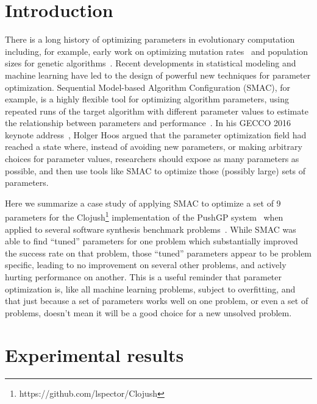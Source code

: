\section{Introduction}
\label{sec:introduction}

There is a long history of optimizing parameters in evolutionary 
computation~\cite{lobo2007parameter}
including, for example, early work on optimizing mutation 
rates~\cite{back1993optimal} and population sizes for genetic algorithms~\cite{alander1992optimal}.
Recent developments in statistical modeling and machine learning have
led to the design of powerful new techniques for parameter optimization. 
Sequential Model-based Algorithm Configuration (SMAC), for example, is a
highly flexible tool for optimizing algorithm parameters, using repeated runs
of the target algorithm with different parameter values to estimate
the relationship between parameters and performance~\cite{HutHooLey11-SMAC}. In his GECCO 2016 keynote 
address~\cite{Hoos:2016:TCM:2908812.2908960}, Holger Hoos argued
that the parameter optimization field had reached a state where, 
instead of avoiding new
parameters, or making arbitrary choices for parameter values, researchers
should expose as many parameters as possible, and then use tools like
SMAC to optimize those (possibly large) sets of parameters.

Here we summarize a case study of applying SMAC to optimize a
set of 9 parameters for the Clojush\footnote{https://github.com/lspector/Clojush} 
implementation of the PushGP system~\cite{spector:2002:GPEM,push3gecco}
when applied to several software synthesis 
benchmark problems~\cite{Helmuth:2015:GECCO}. While SMAC was able to
find ``tuned'' parameters for one problem which substantially improved
the success rate on that problem, those ``tuned'' parameters appear to
be problem specific, leading to no improvement on several other
problems, and actively hurting performance on another. This is a useful
reminder that parameter optimization is, like all machine learning problems,
subject to overfitting, and that just because a set of parameters works 
well on one problem, or even a set of problems, doesn't mean it will be
a good choice for a new unsolved problem.

\section{Experimental results}
\label{sec:experiments}

